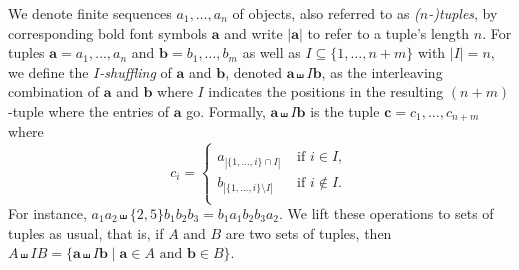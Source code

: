 \documentclass[10pt,a4paper]{amsart}
\theoremstyle{definition}
\numberwithin{equation}{section}
\theoremstyle{plain}
\theoremstyle{definition}
\theoremstyle{myexample}
\theoremstyle{plain}
\theoremstyle{definition}
\renewcommand{\vec}[1]{\boldsymbol{#1}}
\newcommand{\length}[1]{|#1|}
\newcommand{\va}{\vec{a}}
\newcommand{\vb}{\vec{b}}
\newcommand{\vc}{\vec{c}}
\begin{document}
\medskip {}
    We denote finite sequences $a_1, \ldots, a_n$ of objects, also referred to as \emph{($n$-)tuples}, by corresponding bold font symbols $\va$ and write $\length{\va}$ to refer to a tuple's length $n$.  
	For tuples $\va = a_1,\ldots,a_n$ and $\vb = b_1,\ldots,b_m$ as well as $I \subseteq \{1,\ldots,n+m\}$ with $|I|=n$, we define the \emph{$I$-shuffling} of $\va$ and $\vb$, denoted $\va \shuffle{I} \vb$,
	as the interleaving combination of $\va$ and $\vb$ where $I$ indicates the positions in the resulting $(n+m)$-tuple where the entries of $\va$ go. Formally, $\va \shuffle{I} \vb$ is the tuple
	$\vc = c_1,\ldots,c_{n+m}$ where
	$$
	c_i = \begin{cases}\\[-3.7ex]
	a_{|\{1,\ldots,i\} \cap I|} & \text{ if } i \in I,\\[-0.5ex]
	b_{|\{1,\ldots,i\} \setminus I|} & \text{ if } i \not\in I.\\
	\end{cases}
	$$
For instance, $a_1a_2 \shuffle{\{2,5\}} b_1b_2b_3 = b_1a_1b_2b_3a_2$. We lift these operations to sets of tuples as usual, that is, if $A$ and $B$ are two sets of tuples, then $A \shuffle{I} B = \{ \va \shuffle{I} \vb \mid \va\in A \text{ and } \vb\in B\}$. 
\end{document}
